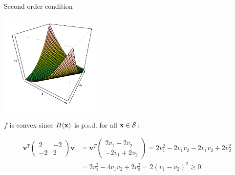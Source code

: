 \documentclass[11pt,compress,t,notes=noshow, xcolor=table]{beamer}
\begin{document}
\begin{vbframe}{Second order condition}
\begin{footnotesize}
\begin{center}
  \includegraphics[width = 0.4\textwidth]{figure_man/convex-example.png}
\end{center}


$f$ is convex since $H(\mathbf{x})$ is p.s.d. for all $\mathbf{x}\in\mathcal{S}$:

\begin{align*}
    \mathbf{v}^T\begin{pmatrix} 2 & -2 \\ -2 & 2 \end{pmatrix}\mathbf{v} &= \mathbf{v}^T \begin{pmatrix} 2v_1 - 2v_2 \\ -2v_1 + 2v_2\end{pmatrix} = 2v_1^2 - 2v_1v_2 -2v_1v_2 + 2v_2^2 \\
    &= 2v_1^2 - 4v_1v_2 + 2v_2^2 = 2 (v_1 - v_2)^2 \ge 0.
\end{align*}


\end{footnotesize}

\end{vbframe}
\end{document}
